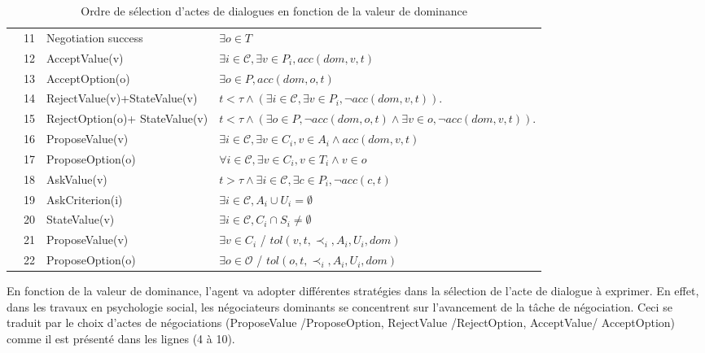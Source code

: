 \begin{table}[!t]
\begin{tabular}{|p{.5cm}|p{.9cm}|p{3.6cm}|p{5.2cm}|}
			\hline
			
			\parbox[t]{2mm}{
				} & 11& Negotiation success &  $\exists o \in T$ \\
			&12& AcceptValue(v) & $\exists i\in\mathcal{C}, \exists v \in P_i, acc(dom, v, t)$ \\
			&13&AcceptOption(o) & $\exists o \in P, acc(dom, o, t)$ \\
			&14&RejectValue(v)+\newline StateValue(v) & $ t<\tau \land (\exists i\in\mathcal{C}, \exists v \in P_i, \neg acc(dom,v, t))$.\\
			&15&RejectOption(o)+ \newline StateValue(v) & $ t<\tau \land (\exists o \in P,  \neg acc(dom,o, t) \land \exists v \in o, \neg acc(dom,v, t))$.\\
			&16&ProposeValue(v) &  $\exists i\in\mathcal{C}, \exists v \in C_i, v \in A_i  \land acc(dom, v, t) $\\
			&17&ProposeOption(o)  & $\forall i\in\mathcal{C},\exists v \in C_i, v \in T_i  \land v \in o$ \\
			&18&AskValue(v) & $t > \tau \land \exists i\in\mathcal{C}, \exists c \in P_i, \neg acc(c, t)$ \\
			&19&AskCriterion(i) & $\exists i\in\mathcal{C}, A_i \cup U_i= \emptyset $\\
			&20&StateValue(v) & $\exists i\in\mathcal{C}, C_i\cap S_i \neq \emptyset$	\\
			&21& ProposeValue(v) & $\exists v \in C_i$ / $tol(v, t, \prec_i, A_i, U_i, dom)$\\
			&22& ProposeOption(o) & $\exists o \in \mathcal{O}$ / $tol(o, t, \prec_i, A_i, U_i, dom)$\\
			
			\hline
		\end{tabular}
		
		\caption{Ordre de sélection d'actes de dialogues en fonction de la valeur de dominance}
		\label{table:uttChoice}
	\end{table}
	
	En fonction de la valeur de dominance, l'agent va adopter différentes stratégies dans la sélection de l'acte de dialogue à exprimer. En effet, dans les travaux en psychologie social, les négociateurs dominants se concentrent sur l'avancement de la tâche de négociation. Ceci se traduit par le choix d'actes de négociations (ProposeValue /ProposeOption, RejectValue /RejectOption, AcceptValue/ AcceptOption) comme il est présenté dans les lignes (4 à 10).
	

